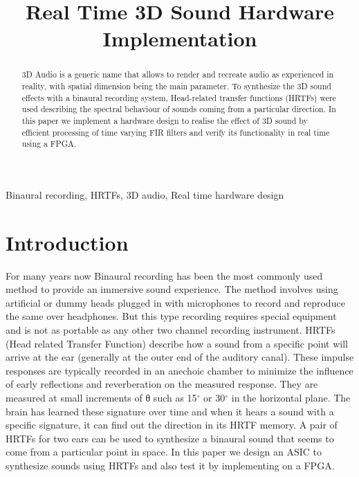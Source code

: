 \documentclass[conference]{IEEEtran}
\begin{document}
\title{Real Time 3D Sound Hardware Implementation\\
}

\author{
\centering
{}
}

\maketitle

\begin{abstract}
3D Audio is a generic name that allows to render and recreate audio as experienced in reality, with spatial dimension being the main parameter. To synthesize the 3D sound effects with a binaural recording system, Head-related transfer functions (HRTFs) were used describing the spectral behaviour of sounds coming from a particular direction. In this paper we implement a hardware design to realise the effect of 3D sound by efficient processing of time varying FIR filters and verify its functionality in real time using a FPGA.  

\end{abstract}

\begin{IEEEkeywords}
Binaural recording, HRTFs, 3D audio, Real time hardware design
\end{IEEEkeywords}

\section{Introduction}
For many years now Binaural recording has been the most commonly used method to provide an immersive sound experience. The method involves using artificial or dummy heads plugged in with microphones to record and reproduce the same over headphones. But this type recording requires special equipment and is not as portable as any other two channel recording instrument. 
HRTFs (Head related Transfer Function) describe how a sound from a specific point will arrive at the ear (generally at the outer end of the auditory canal). These impulse responses are typically recorded in an anechoic chamber to minimize the influence of early reflections and reverberation on the measured response. They are measured at small increments of θ such as 15$^{\circ}$ or 30$^{\circ}$ in the horizontal plane. The brain has learned these signature over time and when it hears a sound with a specific signature, it can find out the direction in its HRTF memory. A pair of HRTFs for two ears can be used to synthesize a binaural sound that seems to come from a particular point in space. In this paper we design an ASIC to synthesize sounds using HRTFs and also test it by implementing on a FPGA.  
\newline
\end{document}
